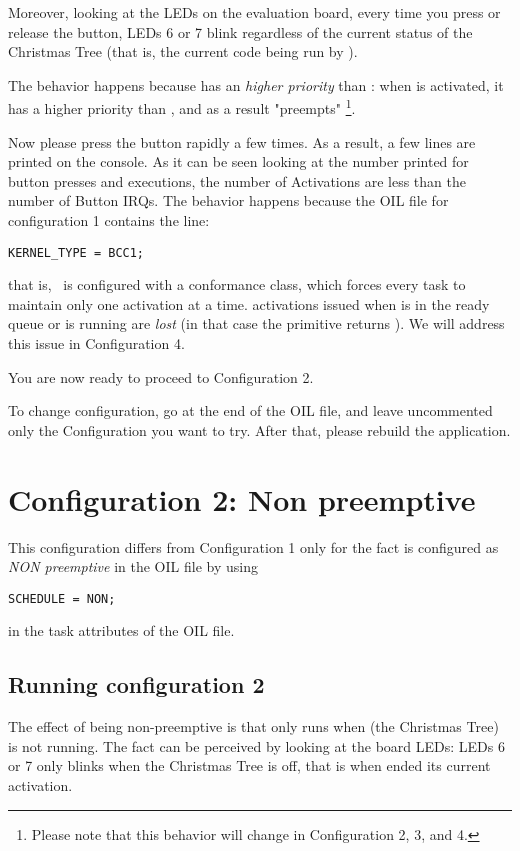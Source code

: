 Moreover, looking at the LEDs on the evaluation board, every time you
press or release the button, LEDs 6 or 7 blink regardless of the
current status of the Christmas Tree (that is, the current code being
run by ).

The behavior happens because  has an {\em higher priority}
than : when  is activated, it has a higher
priority than , and as a result  "preempts"
\footnote{Please note that this behavior will change in
Configuration 2, 3, and 4.}.

Now please press the button rapidly a few times. As a result, a few
lines are printed on the console. As it can be seen looking at the
number printed for button presses and  executions, the
number of  Activations are less than the number of Button
IRQs. The behavior happens because the OIL file for configuration 1
contains the line:
\begin{lstlisting}
KERNEL_TYPE = BCC1;
\end{lstlisting}

\noindent that is, \ee\ is configured with a  conformance class,
which forces every task to maintain only one activation at a
time.  activations issued when  is in the ready
queue or is running are {\em lost} (in that case the 
primitive returns ). We will address this issue in
Configuration 4.

You are now ready to proceed to Configuration 2.

To change configuration, go at the end of the OIL file, and leave
uncommented only the Configuration you want to try.  After that,
please rebuild the application.

\section{Configuration 2: Non preemptive}

This configuration differs from Configuration 1 only for the fact
 is configured as {\em NON preemptive} in the OIL file by
using
\begin{lstlisting}
SCHEDULE = NON;
\end{lstlisting}
in the task attributes of the OIL file.

\subsection{Running configuration 2}
The effect of  being non-preemptive is that  only
runs when  (the Christmas Tree) is not running. The fact can
be perceived by looking at the board LEDs: LEDs 6 or 7 only blinks
when the Christmas Tree is off, that is when  ended its
current activation.

